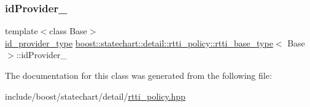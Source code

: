 \subsubsection{\texorpdfstring{id\+Provider\+\_\+}{idProvider\_}}
{\footnotesize\ttfamily template$<$class Base$>$ \\
\mbox{\hyperlink{structboost_1_1statechart_1_1detail_1_1rtti__policy_afd9bc153e4b739bd085ea646f21c3cba}{id\+\_\+provider\+\_\+type}} \mbox{\hyperlink{classboost_1_1statechart_1_1detail_1_1rtti__policy_1_1rtti__base__type}{boost\+::statechart\+::detail\+::rtti\+\_\+policy\+::rtti\+\_\+base\+\_\+type}}$<$ Base $>$\+::id\+Provider\+\_\+\hspace{0.3cm}{\ttfamily [private]}}



The documentation for this class was generated from the following file\+:\begin{DoxyCompactItemize}
\item 
include/boost/statechart/detail/\mbox{\hyperlink{rtti__policy_8hpp}{rtti\+\_\+policy.\+hpp}}\end{DoxyCompactItemize}

